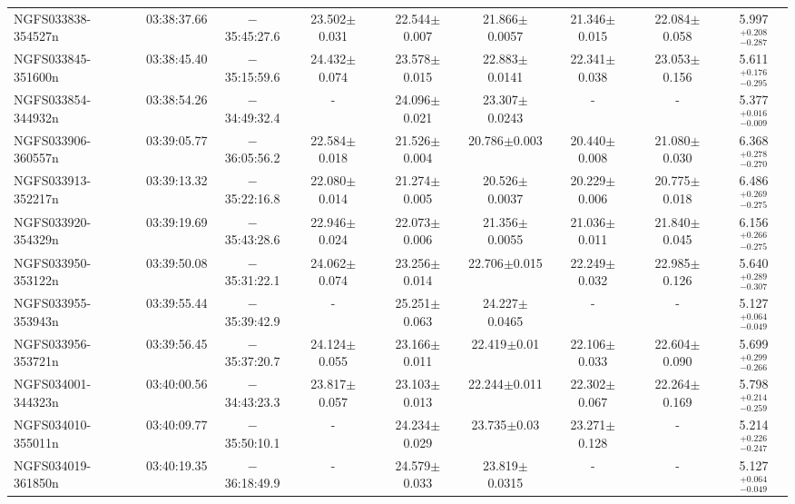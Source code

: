 \begin{tabular}{lcccccccc}
  NGFS033838-354527n & 03:38:37.66 &$-$35:45:27.6   &	23.502$\pm$0.031 & 22.544$\pm$0.007  & 21.866$\pm$0.0057 &  21.346$\pm$0.015 &  22.084$\pm$0.058   &  5.997$_{-0.287} ^{+0.208}$ \\
  NGFS033845-351600n & 03:38:45.40 &$-$35:15:59.6   &	24.432$\pm$0.074 & 23.578$\pm$0.015  & 22.883$\pm$0.0141 &  22.341$\pm$0.038 &  23.053$\pm$0.156   &  5.611$_{-0.295} ^{+0.176}$ \\
  NGFS033854-344932n & 03:38:54.26 &$-$34:49:32.4   &	     -           & 24.096$\pm$0.021  & 23.307$\pm$0.0243 &          -	     &          -	   &  5.377$_{-0.009} ^{+0.016}$ \\
  NGFS033906-360557n & 03:39:05.77 &$-$36:05:56.2   &	22.584$\pm$0.018 & 21.526$\pm$0.004  & 20.786$\pm$0.003  &  20.440$\pm$0.008 &  21.080$\pm$0.030   &  6.368$_{-0.270} ^{+0.278}$ \\
  NGFS033913-352217n & 03:39:13.32 &$-$35:22:16.8   &	22.080$\pm$0.014 & 21.274$\pm$0.005  & 20.526$\pm$0.0037 &  20.229$\pm$0.006 &  20.775$\pm$0.018   &  6.486$_{-0.275} ^{+0.269}$ \\
  NGFS033920-354329n & 03:39:19.69 &$-$35:43:28.6   &	22.946$\pm$0.024 & 22.073$\pm$0.006  & 21.356$\pm$0.0055 &  21.036$\pm$0.011 &  21.840$\pm$0.045   &  6.156$_{-0.275} ^{+0.266}$ \\
  NGFS033950-353122n & 03:39:50.08 &$-$35:31:22.1   &	24.062$\pm$0.074 & 23.256$\pm$0.014  & 22.706$\pm$0.015  &  22.249$\pm$0.032 &  22.985$\pm$0.126   &  5.640$_{-0.307} ^{+0.289}$ \\
  NGFS033955-353943n & 03:39:55.44 &$-$35:39:42.9   &	     -           & 25.251$\pm$0.063  & 24.227$\pm$0.0465 &          -	     &          -	   &  5.127$_{-0.049} ^{+0.064}$ \\
  NGFS033956-353721n & 03:39:56.45 &$-$35:37:20.7   &	24.124$\pm$0.055 & 23.166$\pm$0.011  & 22.419$\pm$0.01   &  22.106$\pm$0.033 &  22.604$\pm$0.090   &  5.699$_{-0.266} ^{+0.299}$ \\
  NGFS034001-344323n & 03:40:00.56 &$-$34:43:23.3   &	23.817$\pm$0.057 & 23.103$\pm$0.013  & 22.244$\pm$0.011  &  22.302$\pm$0.067 &  22.264$\pm$0.169   &  5.798$_{-0.259} ^{+0.214}$ \\
  NGFS034010-355011n & 03:40:09.77 &$-$35:50:10.1   &	     -           & 24.234$\pm$0.029  & 23.735$\pm$0.03   &  23.271$\pm$0.128 &          -	   &  5.214$_{-0.247} ^{+0.226}$ \\
  NGFS034019-361850n & 03:40:19.35 &$-$36:18:49.9   &	     -           & 24.579$\pm$0.033  & 23.819$\pm$0.0315 &          -	     &          -	   &  5.127$_{-0.049} ^{+0.064}$ \\

\end{tabular}
